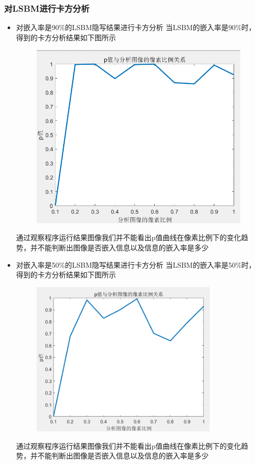 \documentclass[a4paper,11pt,UTF8]{ctexart}
\newcommand{\bottomcaption}{%
\setlength{\abovecaptionskip}{6pt}%
\setlength{\belowcaptionskip}{6pt}%
\caption}
\newcommand{\xiaowuhao}{\fontsize{9pt}{\baselineskip}\selectfont}   %
\begin{document}
    \subsubsection{对LSBM进行卡方分析}
      \begin{itemize}
        \item 对嵌入率是90\%的LSBM隐写结果进行卡方分析
          当LSBM的嵌入率是90\%时，得到的卡方分析结果如下图所示
          \begin{figure}[H]
            \centering
            \includegraphics[width=11cm]{k2_LSBM_90.png}
            \bottomcaption{\xiaowuhao{对嵌入率为90\%的LSBM隐写图像卡方分析结果}}
          \end{figure}
          通过观察程序运行结果图像我们并不能看出p值曲线在像素比例下的变化趋势，并不能判断出图像是否嵌入信息以及信息的嵌入率是多少
\newpage
        \item 对嵌入率是50\%的LSBM隐写结果进行卡方分析
        当LSBM的嵌入率是50\%时，得到的卡方分析结果如下图所示
        \begin{figure}[H]
          \centering
          \includegraphics[width=9cm]{k2_LSBM_50.png}
          \bottomcaption{\xiaowuhao{对嵌入率为50\%的LSBM隐写图像卡方分析结果}}
        \end{figure}
        通过观察程序运行结果图像我们并不能看出p值曲线在像素比例下的变化趋势，并不能判断出图像是否嵌入信息以及信息的嵌入率是多少


\end{itemize}
\end{document}
